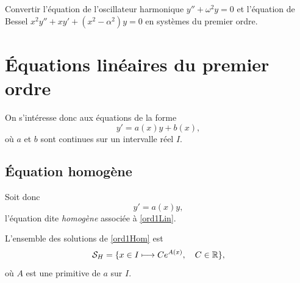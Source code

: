 \documentclass[../main.tex]{subfiles}
\begin{document}
\begin{exo}
	Convertir l'équation de l'oscillateur harmonique $y'' + \omega^2y = 0$ et l'équation de Bessel $x^2y'' + xy' + (x^2-\alpha^2)y = 0 $ en systèmes du premier ordre.
\end{exo}

\section{Équations linéaires du premier ordre}

On s'intéresse donc aux équations de la forme
	\begin{equation}\label{ord1Lin}
    y' = a(x)y + b(x),\tag{E}
    \end{equation}
où $a$ et $b$ sont continues sur un intervalle réel $I$.

\subsection{Équation homogène}

Soit donc
	\begin{equation}\label{ord1Hom}
	y' = a(x)y,\tag{H}
	\end{equation}
l'équation dite \textit{homogène} associée à \eqref{ord1Lin}.

\begin{thm}[Cas $b=0$]
L'ensemble des solutions de \eqref{ord1Hom} est
	\begin{equation*}
    \mathcal{S}_{H} = 
	\lbrace
    x\in I \longmapsto Ce^{A(x)},\quad C\in\mathbb R
    \rbrace,
	\end{equation*}
où $A$ est une primitive de $a$ sur $I$.
\end{thm}
\end{document}
